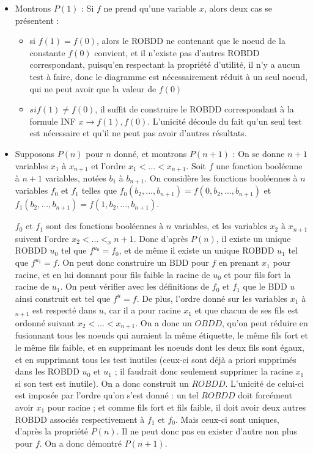 \documentclass[a4paper,11pt]{article}
\begin{document}
		\begin{itemize}
		\item Montrons $P(1)$ : \newline
		Si $f$ ne prend qu'une variable $x$, alors deux cas se présentent :
			\begin{itemize} 
			\item si $f(1) = f(0)$, alors le ROBDD ne contenant que le noeud de la constante $f(0)$ convient, et il n'existe pas d'autres ROBDD correspondant, puisqu'en respectant la propriété d'utilité, il n'y a aucun test à faire, donc le diagramme est nécessairement réduit à un seul noeud, qui ne peut avoir que la valeur de $f(0)$ \item $si f(1) \neq f(0)$, il suffit de construire le ROBDD correspondant à la formule INF $x \rightarrow f(1),f(0)$. L'unicité découle du fait qu'un seul test est nécessaire et qu'il ne peut pas avoir d'autres résultats.
			\end{itemize}
		\item Supposons $P(n)$ pour $n$ donné, et montrons $P(n+1)$ :
		On se donne $n+1$ variables $x_1$ à $x_{n+1}$ et l'ordre $x_1 < ... < x_{n+1}$.
		Soit $f$ une fonction booléenne à $n+1$ variables, notées $b_1$ à $b_{n+1}$. On considère les fonctions booléennes à $n$ variables $f_0$ et $f_1$ telles que $f_0(b_2,...,b_{n+1}) = f(0,b_2,...,b_{n+1})$ et $f_1(b_2,...,b_{n+1}) = f(1,b_2,...,b_{n+1})$.
		
		$f_0$ et $f_1$ sont des fonctions booléennes à $n$ variables, et  les variables $x_2$ à $x_{n+1}$ suivent l'ordre $x_2 < ... < _ x{n+1}$. Donc d'après $P(n)$, il existe un unique ROBDD $u_0$ tel que $f^{u_0} = f_0$, et de même il existe un unique ROBDD $u_1$ tel que $f^{u_1} = f$.
		On peut donc construire un BDD pour $f$ en prenant $x_1$ pour racine, et en lui donnant pour fils faible la racine de $u_0$ et pour fils fort la racine de $u_1$. On peut vérifier avec les définitions de $f_0$ et $f_1$ que le BDD $u$ ainsi construit est tel que $f^u = f$. De plus, l'ordre donné sur les variables $x_1$ à $_{n+1}$ est respecté dans $u$, car il a pour racine $x_1$ et que chacun de ses fils est ordonné suivant $x_2 < ... < x_{n+1}$. On a donc un $OBDD$, qu'on peut réduire en fusionnant tous les noeuds qui auraient la même étiquette, le même fils fort et le même fils faible, et en supprimant les noeuds dont les deux fils sont égaux, et en supprimant tous les test inutiles (ceux-ci sont déjà a priori supprimés dans les ROBDD $u_0$ et $u_1$ ; il faudrait donc seulement supprimer la racine $x_1$ si son test est inutile). On a donc construit un $ROBDD$. L'unicité de celui-ci est imposée par l'ordre qu'on s'est donné : un tel $ROBDD$ doit forcément avoir $x_1$ pour racine ; et comme fils fort et fils faible, il doit avoir deux autres ROBDD associés respectivement à $f_1$ et $f_0$. Mais ceux-ci sont uniques, d'après la propriété $P(n)$. Il ne peut donc pas en exister d'autre non plus pour $f$. On a donc démontré $P(n+1)$.
		\end{itemize}
\end{document}
